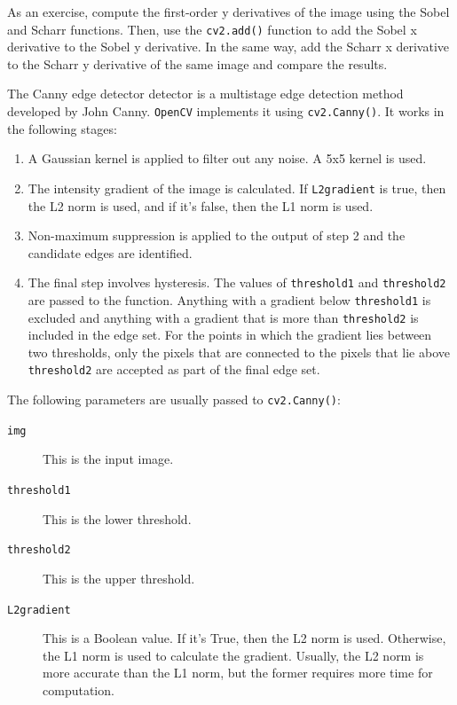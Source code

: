 \documentclass{labo}
\newcommand{\opencv}{\texttt{OpenCV} }
\begin{document}
\begin{leftbar}
As an exercise, compute the first-order y derivatives of the image using the Sobel and Scharr functions. Then, use the \texttt{cv2.add()} function to add the Sobel x derivative to the Sobel y derivative. In the same way, add the Scharr x derivative to the Scharr y derivative of the same image and compare the results.
\end{leftbar}

The Canny edge detector detector is a multistage edge detection method developed by John Canny. \opencv implements it using \texttt{cv2.Canny()}. It works in the following stages: 


\begin{enumerate}
	\item A Gaussian kernel is applied to filter out any noise. A 5x5 kernel is used. 

	\item The intensity gradient of the image is calculated. If \texttt{L2gradient} is true, then the L2 norm is used, and if it's false, then the L1 norm is used. 

	\item Non-maximum suppression is applied to the output of step 2 and the candidate edges are identified. 

	\item The final step involves hysteresis. The values of \texttt{threshold1} and \texttt{threshold2} are passed to the function. Anything with a gradient below \texttt{threshold1} is excluded and anything with a gradient that is more than \texttt{threshold2} is included in the edge set. For the points in which the gradient lies between two thresholds, only the pixels that are connected to the pixels that lie above \texttt{threshold2} are accepted as part of the final edge set.
\end{enumerate}

The following parameters are usually passed to \texttt{cv2.Canny()}:
\begin{description}
	\item[\texttt{img}] This is the input image.
	\item[\texttt{threshold1}] This is the lower threshold.
	\item[\texttt{threshold2}] This is the upper threshold.
	\item[\texttt{L2gradient}] This is a Boolean value. If it's True, then the L2 norm is used. Otherwise, the L1 norm is used to calculate the gradient. Usually, the L2 norm is more accurate than the L1 norm, but the former requires more time for computation.
\end{description}
\end{document}

